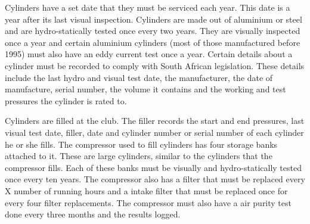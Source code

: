 \documentclass[12pt,a4paper]{article}
\begin{document}
Cylinders have a set date that they must be serviced each year. This date is a
year after its last visual inspection. Cylinders are made out of aluminium or
steel and are hydro-statically tested once every two years. They are visually
inspected once a year and certain aluminium cylinders (most of those
manufactured before 1995) must also have an eddy current test once a year.
Certain details about a cylinder must be recorded to comply with South African
legislation. These details include the last hydro and visual test date, the
manufacturer, the date of manufacture, serial number, the volume it contains and
the working and test pressures the cylinder is rated to.

Cylinders are filled at the club. The filler records the start and end
pressures, last visual test date, filler, date and cylinder number or serial
number of each cylinder he or she fills. The compressor used to fill cylinders
has four storage banks attached to it. These are large cylinders, similar to the
cylinders that the compressor fills. Each of these banks must be visually and
hydro-statically tested once every ten years. The compressor also has a filter
that must be replaced every X number of running hours and a intake filter that
must be replaced once for every four filter replacements. The compressor must
also have a air purity test done every three months and the results logged.
\end{document}
